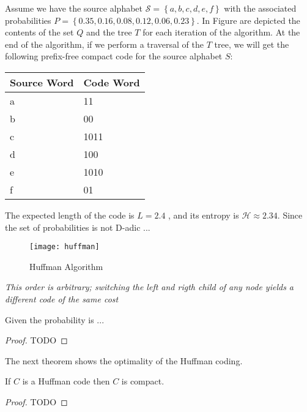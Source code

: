 \begin{example}
Assume we have the source alphabet $\mathcal{S}=\left\{a, b, c, d, e, f\right\}$ with the associated probabilities $P = \left\{0.35, 0.16, 0.08, 0.12, 0.06, 0.23 \right\}$. In Figure \label{fig:Huffman-Algorithm} are depicted the contents of the set $Q$ and the tree $T$ for each iteration of the algorithm. At the end of the algorithm, if we perform a traversal of the $T$ tree, we will get the following prefix-free compact code for the source alphabet $S$: 

\bigskip

\centering
\begin{tabular}{l l}
\toprule
\textbf{Source Word} & \textbf{Code Word} \\
\midrule
a & 11   \\
b & 00   \\
c & 1011 \\
d & 100  \\
e & 1010 \\
f & 01   \\
\bottomrule
\end{tabular}

\bigskip

The expected length of the code is $L = 2.4$ , and its entropy is $\mathcal{H} \approx 2.34$. Since the set of probabilities is not D-adic ...


\end{example}

\begin{figure}[h]
\centering\texttt{[image: huffman]}
\caption{\label{fig:Huffman-Algorithm}Huffman Algorithm}
\end{figure}

\emph{This order is arbitrary; switching the left and rigth child of any node yields a different code of the same cost}


\begin{proposition}
Given the probability is ...
\end{proposition}
\begin{proof}
{\color{red} TODO}
\end{proof}

The next theorem shows the optimality of the Huffman coding.

\begin{theorem}
If $C$ is a Huffman code then $C$ is compact.
\end{theorem}
\begin{proof}
{\color{red} TODO}
\end{proof}


